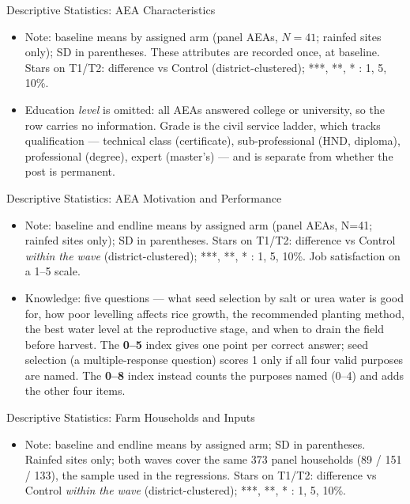 \documentclass[aspectratio=169]{beamer}
\newcommand{\notefont}{\fontsize{5pt}{6pt}\selectfont}
\begin{document}
\begin{frame}{Descriptive Statistics: AEA Characteristics}
	\centering
	\begin{itemize}\notefont
		\item Note: baseline means by assigned arm (panel AEAs, $N=41$; rainfed sites only);
		SD in parentheses. These attributes are recorded once, at baseline. Stars on T1/T2:
		difference vs Control (district-clustered); ***, **, * : 1, 5, 10\%.
		\item Education \emph{level} is omitted: all AEAs answered college or university,
		so the row carries no information. Grade is the civil service ladder, which tracks
		qualification --- technical class (certificate), sub-professional (HND, diploma),
		professional (degree), expert (master's) --- and is separate from whether the post
		is permanent.
	\end{itemize}
\end{frame}

\begin{frame}{Descriptive Statistics: AEA Motivation and Performance}
	\centering
	\begin{itemize}\notefont
		\item Note: baseline and endline means by assigned arm (panel AEAs, N=41; rainfed sites only); SD in
		parentheses. Stars on T1/T2: difference vs Control \emph{within the wave}
		(district-clustered); ***, **, * : 1, 5, 10\%. Job satisfaction on a 1--5 scale.
		\item Knowledge: five questions --- what seed selection by salt or urea water is good for, how poor levelling affects rice growth, the recommended planting method, the best water level at the reproductive stage, and when to drain the field before harvest.
		The \textbf{0--5} index gives one point per correct answer; seed selection (a multiple-response question) scores 1 only if all four valid purposes are named. The \textbf{0--8} index instead counts the purposes named (0--4) and adds the other four items.
	\end{itemize}
\end{frame}

\begin{frame}{Descriptive Statistics: Farm Households and Inputs}
	\centering
	\begin{itemize}\notefont
		\item Note: baseline and endline means by assigned arm; SD in parentheses. Rainfed sites
		only; both waves cover the same 373 panel households (89 / 151 / 133), the sample used
		in the regressions.
		Stars on T1/T2: difference vs Control
		\emph{within the wave} (district-clustered); ***, **, * : 1, 5, 10\%.
	\end{itemize}
\end{frame}
\end{document}
